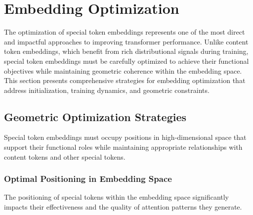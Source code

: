 
\section{Embedding Optimization}

The optimization of special token embeddings represents one of the most direct and impactful approaches to improving transformer performance. Unlike content token embeddings, which benefit from rich distributional signals during training, special token embeddings must be carefully optimized to achieve their functional objectives while maintaining geometric coherence within the embedding space. This section presents comprehensive strategies for embedding optimization that address initialization, training dynamics, and geometric constraints.

\subsection{Geometric Optimization Strategies}

Special token embeddings must occupy positions in high-dimensional space that support their functional roles while maintaining appropriate relationships with content tokens and other special tokens.

\subsubsection{Optimal Positioning in Embedding Space}

The positioning of special tokens within the embedding space significantly impacts their effectiveness and the quality of attention patterns they generate.

